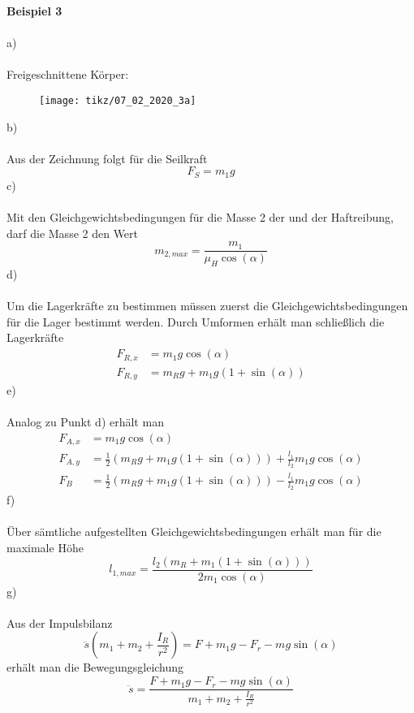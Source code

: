 \newpage
\noindent
\textbf{Beispiel 3}\\ \\
a)\\ \\
Freigeschnittene Körper:
\begin{figure}[h]
	\centering
	\texttt{[image: tikz/07\_02\_2020\_3a]}
\end{figure}
\newline
b)\\ \\
Aus der Zeichnung folgt für die Seilkraft
\[
	F_S = m_1g
\]
c) \\ \\
Mit den Gleichgewichtsbedingungen für die Masse 2 der und der Haftreibung, darf die Masse 2 den Wert
\[
	m_{2,max} = \frac{m_1}{\mu_H \cos(\alpha)}
\]
d) \\ \\
Um die Lagerkräfte zu bestimmen müssen zuerst die Gleichgewichtsbedingungen für die Lager bestimmt werden. Durch Umformen erhält man schließlich die Lagerkräfte
\begin{align*}
	F_{R,x} &= m_1g\cos(\alpha) \\
	F_{R,y} &= m_Rg + m_1g(1 + \sin(\alpha))
\end{align*}
e) \\ \\
Analog zu Punkt d) erhält man
\begin{align*}
	F_{A,x} &= m_1g\cos(\alpha) \\
	F_{A,y} &= \frac{1}{2}(m_Rg + m_1g(1 + \sin(\alpha))) + \frac{l_1}{l_2}m_1g\cos(\alpha) \\
	F_B &= \frac{1}{2}(m_Rg + m_1g(1 + \sin(\alpha))) - \frac{l_1}{l_2}m_1g\cos(\alpha)
\end{align*}
\newpage
\noindent
f)\\ \\
Über sämtliche aufgestellten Gleichgewichtsbedingungen erhält man für die maximale Höhe
\[
	l_{1,max} = \frac{l_2(m_R + m_1(1 + \sin(\alpha)))}{2m_1\cos(\alpha)}
\]
g)\\ \\
Aus der Impulsbilanz
\[
	\ddot{s}(m_1 + m_2 + \frac{I_R}{r^2}) = F + m_1g - F_r - mg\sin(\alpha)
\]
erhält man die Bewegungsgleichung
\[
	\ddot{s} = \frac{F + m_1g - F_r - mg\sin(\alpha)
		}{m_1 + m_2 + \frac{I_R}{r^2}}
\]